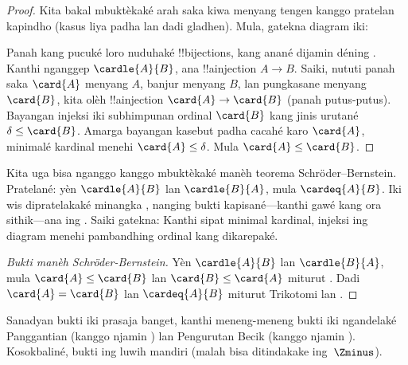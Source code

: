 \documentclass[../../../include/open-logic-section]{subfiles}
\begin{document}
\begin{proof}
Kita bakal mbuktèkaké arah saka kiwa menyang tengen kanggo
pratelan kapindho (kasus liya padha lan dadi gladhen). Mula,
gatekna diagram iki:
\begin{center}
\end{center}
Panah kang pucuké loro nuduhaké !!{bijection}s, kang anané
dijamin déning . Kanthi nganggep
$\cardle{A}{B}$, ana !!a{injection} $A\to B$. Saiki,
nututi panah saka $\card{A}$ menyang $A$, banjur menyang
$B$, lan pungkasane menyang $\card{B}$, kita olèh
!!a{injection} $\card{A} \to \card{B}$ (panah putus-putus). Bayangan injeksi iki subhimpunan ordinal $\card{B}$ kang jinis urutané $\delta \leq \card{B}$. Amarga bayangan kasebut padha cacahé karo $\card{A}$, minimalé kardinal menehi $\card{A} \leq \delta$. Mula $\card{A} \leq \card{B}$.
\end{proof}\noindent Kita uga bisa nganggo 
kanggo mbuktèkaké manèh teorema Schr\"{o}der--Bernstein. Pratelané:
yèn $\cardle{A}{B}$ lan $\cardle{B}{A}$, mula $\cardeq{A}{B}$. Iki wis
dipratelakaké minangka ,
nanging bukti kapisané---kanthi gawé kang ora sithik---ana ing
.
Saiki gatekna:
Kanthi sipat minimal kardinal, injeksi ing diagram menehi pambandhing ordinal kang dikarepaké.

\begin{proof}[Bukti manèh Schr\"oder-Bernstein]
Yèn $\cardle{A}{B}$ lan $\cardle{B}{A}$, mula $\card{A} \leq \card{B}$
lan $\card{B} \leq \card{A}$ miturut . Dadi
$\card{A} = \card{B}$ lan $\cardeq{A}{B}$ miturut Trikotomi lan
.
\end{proof}
\noindent
Sanadyan bukti iki prasaja banget, kanthi meneng-meneng bukti
iki ngandelaké Panggantian (kanggo njamin
) lan
Pengurutan Becik (kanggo njamin ).
Kosokbaliné, bukti ing  luwih
mandiri (malah bisa ditindakake ing~$\Zminus$).
\end{document}
